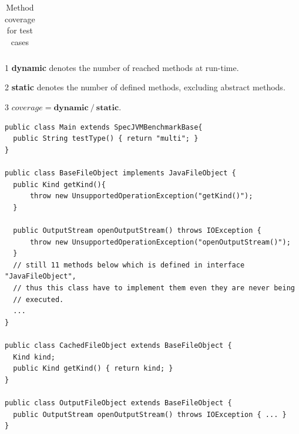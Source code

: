 \documentclass{fac}
\begin{document}
\begin{table}
\begin{tabular*}{1.0\textwidth}{|l|c|c|c|c|c|c|c|c|c|c|c|c|}
\hline
\end{tabular*}
\begin{tablenotes}
  \item[1] \textbf{dynamic} denotes the number of reached methods at run-time.
  \item[2] \textbf{static} denotes the number of defined methods, excluding abstract methods.
  \item[3] $\textit{coverage} = \textbf{dynamic}\ /\ \textbf{static}$.
\end{tablenotes}
\caption{Method coverage for test cases}\label{table:coverage}
\end{table}





\begin{minipage}{0.96\linewidth}
\begin{lstlisting}[caption={Example code for uncovered methods },label={lst:uncovered-method}]
public class Main extends SpecJVMBenchmarkBase{
  public String testType() { return "multi"; }
}

public class BaseFileObject implements JavaFileObject {
  public Kind getKind(){
      throw new UnsupportedOperationException("getKind()");
  }
		
  public OutputStream openOutputStream() throws IOException {
	  throw new UnsupportedOperationException("openOutputStream()");
  }
  // still 11 methods below which is defined in interface "JavaFileObject",
  // thus this class have to implement them even they are never being
  // executed.
  ...
}

public class CachedFileObject extends BaseFileObject {		
  Kind kind;	
  public Kind getKind() { return kind; }
}

public class OutputFileObject extends BaseFileObject {
  public OutputStream openOutputStream() throws IOException { ... }
}
\end{lstlisting}
\end{minipage}
\end{document}
